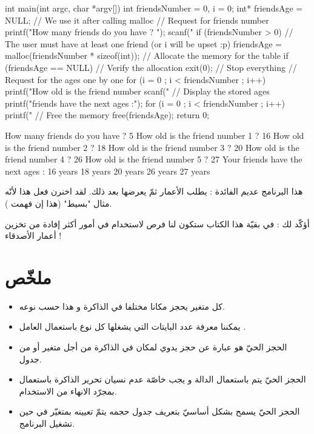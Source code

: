 \begin{Csource}
int main(int argc, char *argv[])
{
  int friendsNumber = 0, i = 0;
  int* friendsAge = NULL; // We use it after calling malloc
  // Request for friends number
  printf("How many friends do you have ? ");
  scanf("%
  if (friendsNumber > 0) // The user must have at least one friend (or i will be upset :p)
  {
    friendsAge = malloc(friendsNumber * sizeof(int)); // Allocate the memory for the table
    if (friendsAge == NULL) // Verify the allocation
    {
      exit(0); // Stop everything
    }
    // Request for the ages one by one
    for (i = 0 ; i < friendsNumber ; i++)
    {
      printf("How old is the friend number %
      scanf("%
    }
    // Display the stored ages
    printf("\n\nYour friends have the next ages :\n");
    for (i = 0 ; i < friendsNumber ; i++)
    {
      printf("%
    }
    // Free the memory
    free(friendsAge);
  }
  return 0;
}
\end{Csource}

\begin{Console}
How many friends do you have ? 5
How old is the friend number 1 ? 16
How old is the friend number 2 ? 18
How old is the friend number 3 ? 20
How old is the friend number 4 ? 26
How old is the friend number 5 ? 27
Your friends have the next ages :
16 years
18 years
20 years
26 years
27 years
\end{Console}

هذا البرنامج عديم الفائدة : يطلب الأعمار ثمّ يعرضها بعد ذلك. لقد اخنرن فعل هذا لأنّه مثال "بسيط" (هذا إن فهمت
).

أؤكّد لك : في بقيّة هذا الكتاب ستكون لنا فرص لاستخدام
في أمور أكثر إفادة من تخزين أعمار الأصدقاء !

\section*{ملخّص}
\begin{itemize}
  \item كل متغير يحجز مكانا مختلفا في الذاكرة و هذا حسب نوعه.
  \item يمكننا معرفة عدد البايتات التي يشغلها كل نوع باستعمال العامل .
  \item الحجز الحيّ هو عبارة عن حجز يدوي لمكان في الذاكرة من أجل متغير أو من جدول.
  \item الحجز الحيّ يتم باستعمال الدالة
و يجب خاصّة عدم نسيان تحرير الذاكرة باستعمال
بمجرّد الانهاء من الاستخدام.
  \item الحجز الحيّ يسمح بشكل أساسيّ بتعريف جدول حجمه يتمّ تعيينه بمتغيّر في حين تشغيل البرنامج.
\end{itemize}
